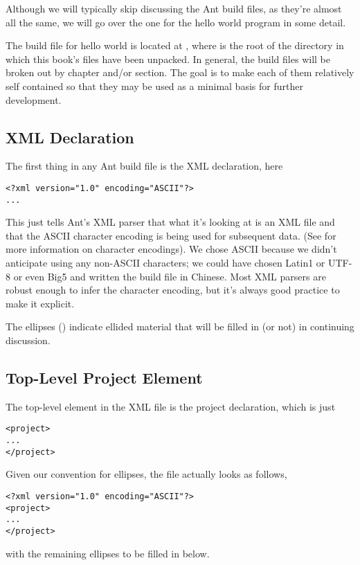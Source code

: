 Although we will typically skip discussing the Ant build files,
as they're almost all the same, we will go over the one for the
hello world program in some detail.  

The build file for hello world is located at
, where \relpath{} is the root of the
directory in which this book's files have been unpacked.  In general, the
build files will be broken out by chapter and/or section.  The goal is
to make each of them relatively self contained so that they may be
used as a minimal basis for further development.

\subsection{XML Declaration}

The first thing in any Ant build file is the XML declaration, here
%
\begin{verbatim}
<?xml version="1.0" encoding="ASCII"?>
...
\end{verbatim}
%
This just tells Ant's XML parser that what it's looking at is an XML
file and that the ASCII character encoding is being used for
subsequent data.  (See
 for more information on character encodings).  
We chose ASCII because we didn't anticipate using any non-ASCII
characters; we could have chosen Latin1 or UTF-8 or even Big5 and
written the build file in Chinese.  Most XML parsers are robust enough
to infer the character encoding, but it's always good practice to make
it explicit.

The ellipses () indicate ellided material that will be
filled in (or not) in continuing discussion.  

\subsection{Top-Level Project Element} 

The top-level element in the XML file is the project declaration,
which is just
%
\begin{verbatim}
<project>
...
</project>
\end{verbatim}
%
Given our convention for ellipses, the file actually looks as follows,

\begin{verbatim}
<?xml version="1.0" encoding="ASCII"?>
<project>
...
</project>
\end{verbatim}
%
with the remaining ellipses to be filled in below.

